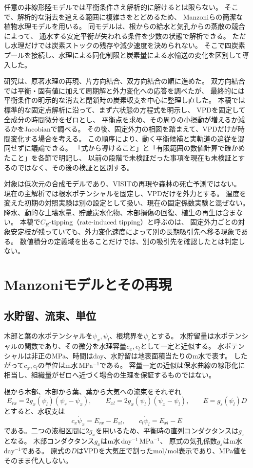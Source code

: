 \documentclass[a4paper,11pt]{ltjsarticle}
\begin{document}
任意の非線形陸モデルでは平衡条件さえ解析的に解けるとは限らない。
そこで、解析的な消去を追える範囲に複雑さをとどめるため、
Manzoniら\cite{manzoni2014}の簡潔な植物水理モデルを用いる。
同モデルは、根からの給水と気孔からの蒸散の競合によって、
通水する安定平衡が失われる条件を少数の状態で解析できる。
ただし水理だけでは炭素ストックの残存や減少速度を決められない。
そこで四炭素プールを接続し、水理による同化制限と炭素量による水輸送の変化を区別して導入した。

研究は、原著水理の再現、片方向結合、双方向結合の順に進めた。
双方向結合では平衡・固有値に加えて周期解と外力変化への応答を調べたが、
最終的には平衡条件の明示的な消去と閉鎖時の炭素収支を中心に整理し直した。
本稿では標準的な固定点解析に沿って、まず六状態の方程式を明示し、
VPDを固定して全成分の時間微分をゼロとし、
平衡点を求め、その周りの小摂動が増えるか減るかをJacobianで調べる。
その後、固定外力の相図を踏まえて、VPDだけが時間変化する場合を考える。
この順序により、動く平衡候補と実軌道の追従を混同せずに議論できる。
「式から導けること」と「有限範囲の数値計算で確かめたこと」を各節で明記し、
以前の段階で未検証だった事項を現在も未検証とするのではなく、その後の検証と区別する。

対象は低次元の合成モデルであり、VISITの再現や森林の死亡予測ではない。
現在の主解析では根水ポテンシャルを固定し、VPDだけを外力とする。
温度を変えた初期の対照実験は別の設定として扱い、現在の固定係数実験と混ぜない。
降水、動的な土壌水量、貯蔵炭水化物、木部損傷の回復、植生の再生は含まない。
本稿で$C_R$-tipping（rate-induced tipping）と呼ぶのは、
固定外力ごとの対象安定枝が残っていても、外力変化速度によって別の長期吸引先へ移る現象である。
数値積分の定義域を出ることだけでは、別の吸引先を確認したとは判定しない。

\section{Manzoniモデルとその再現}\label{sec:manzoni}
\subsection{水貯留、流束、単位}
木部と葉の水ポテンシャルを$\psi_x,\psi_l$、根境界を$\psi_r$とする。
水貯留量は水ポテンシャルの関数であり、その微分を水理容量$c_x,c_l$として一定と近似する。
水ポテンシャルは非正のMPa、時間はday、水貯留は地表面積当たりのm水で表す。
したがって$c_x,c_l$の単位はm水\,MPa$^{-1}$である。
容量一定の近似は保水曲線の線形化に相当し、組織量がゼロへ近づく場合の生理を保証するものではない。

根から木部、木部から葉、葉から大気への流束をそれぞれ
\begin{equation}\label{eq:waterflux}
 E_{rx}=2g_x(\psi_l)(\psi_r-\psi_x),\qquad
 E_{xl}=2g_x(\psi_l)(\psi_x-\psi_l),\qquad
 E=g_s(\psi_l)D
\end{equation}
とすると、水収支は
\begin{equation}\label{eq:water}
 c_x\dot\psi_x=E_{rx}-E_{xl},\qquad
 c_l\dot\psi_l=E_{xl}-E
\end{equation}
である。二つの液相区間に$2g_x$を用いるため、平衡時の直列コンダクタンスは$g_x$となる。
木部コンダクタンス$g_x$はm水\,day$^{-1}$\,MPa$^{-1}$、
原式の気孔係数$g_s$はm水\,day$^{-1}$である。
原式の$D$はVPDを大気圧で割ったmol/mol表示であり、MPa値をそのまま代入しない。
\end{document}
